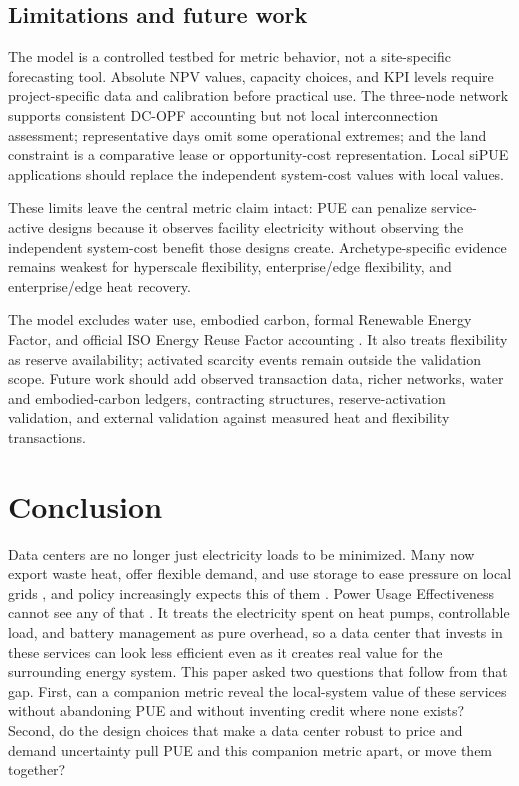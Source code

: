 \documentclass[preprint,12pt]{elsarticle}
\begin{document}
\subsection{Limitations and future work}
\label{sec:limitations}

The model is a controlled testbed for metric behavior, not a site-specific forecasting tool. Absolute NPV values, capacity choices, and KPI levels require project-specific data and calibration before practical use. The three-node network supports consistent DC-OPF accounting but not local interconnection assessment; representative days omit some operational extremes; and the land constraint is a comparative lease or opportunity-cost representation. Local siPUE applications should replace the independent system-cost values with local values.

These limits leave the central metric claim intact: PUE can penalize service-active designs because it observes facility electricity without observing the independent system-cost benefit those designs create. Archetype-specific evidence remains weakest for hyperscale flexibility, enterprise/edge flexibility, and enterprise/edge heat recovery.

The model excludes water use, embodied carbon, formal Renewable Energy Factor, and official ISO Energy Reuse Factor accounting \cite{ISO30134,EUDataCenterDirective2023}. It also treats flexibility as reserve availability; activated scarcity events remain outside the validation scope. Future work should add observed transaction data, richer networks, water and embodied-carbon ledgers, contracting structures, reserve-activation validation, and external validation against measured heat and flexibility transactions.

\section{Conclusion}

Data centers are no longer just electricity loads to be minimized. Many now export waste heat, offer flexible demand, and use storage to ease pressure on local grids \cite{11,13}, and policy increasingly expects this of them \cite{15}. Power Usage Effectiveness cannot see any of that \cite{Belady2008PUE}. It treats the electricity spent on heat pumps, controllable load, and battery management as pure overhead, so a data center that invests in these services can look less efficient even as it creates real value for the surrounding energy system. This paper asked two questions that follow from that gap. First, can a companion metric reveal the local-system value of these services without abandoning PUE and without inventing credit where none exists? Second, do the design choices that make a data center robust to price and demand uncertainty pull PUE and this companion metric apart, or move them together?
\end{document}
